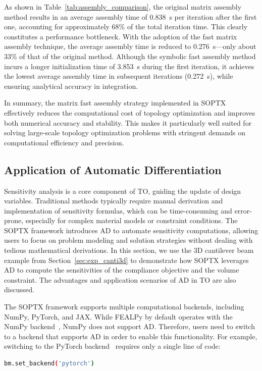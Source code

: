 \documentclass[mathpazo]{cicp}
\begin{document}
As shown in Table~\ref{tab:assembly_comparison}, the original matrix assembly method results in an average assembly time of \SI{0.838}{s} per iteration after the first one, accounting for approximately $68\%$ of the total iteration time. This clearly constitutes a performance bottleneck. With the adoption of the fast matrix assembly technique, the average assembly time is reduced to \SI{0.276}{s}---only about $33\%$ of that of the original method. Although the symbolic fast assembly method incurs a longer initialization time of \SI{3.853}{s} during the first iteration, it achieves the lowest average assembly time in subsequent iterations (\SI{0.272}{s}), while ensuring analytical accuracy in integration.

In summary, the matrix fast assembly strategy implemented in SOPTX effectively reduces the computational cost of topology optimization and improves both numerical accuracy and stability. This makes it particularly well suited for solving large-scale topology optimization problems with stringent demands on computational efficiency and precision.

\subsection{Application of Automatic Differentiation}\label{sec:exp_canti3d_ad}
Sensitivity analysis is a core component of TO, guiding the update of design variables. Traditional methods typically require manual derivation and implementation of sensitivity formulas, which can be time-consuming and error-prone, especially for complex material models or constraint conditions. The SOPTX framework introduces AD to automate sensitivity computations, allowing users to focus on problem modeling and solution strategies without dealing with tedious mathematical derivations. In this section, we use the 3D cantilever beam example from Section~\ref{sec:exp_canti3d} to demonstrate how SOPTX leverages AD to compute the sensitivities of the compliance objective and the volume constraint. The advantages and application scenarios of AD in TO are also discussed.

The SOPTX framework supports multiple computational backends, including NumPy, PyTorch, and JAX. While FEALPy by default operates with the NumPy backend~\cite{harris2020array}, NumPy does not support AD. Therefore, users need to switch to a backend that supports AD in order to enable this functionality. For example, switching to the PyTorch backend~\cite{paszke2017automatic} requires only a single line of code:
\begin{lstlisting}[language=bash]
	bm.set_backend('pytorch')
\end{lstlisting}
\end{document}
